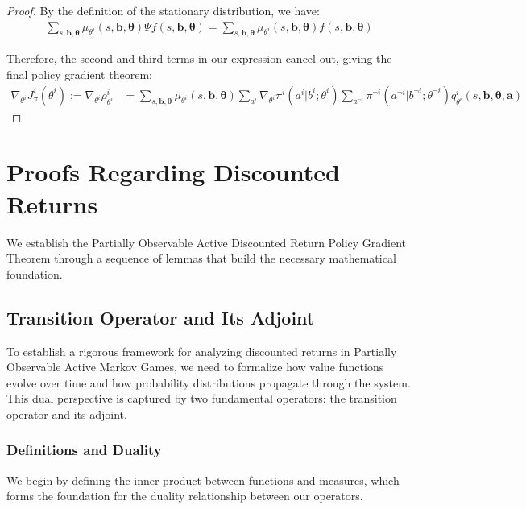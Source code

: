 \documentclass[a4paper,12pt]{report}
\begin{document}
\begin{proof}
    By the definition of the stationary distribution, we have:
    \begin{align}
        \sum_{s, \boldsymbol{b}, \boldsymbol{\theta}}\mu_{\theta^i}(s, \boldsymbol{b}, \boldsymbol{\theta}) \Psi f(s, \boldsymbol{b}, \boldsymbol{\theta}) = \sum_{s, \boldsymbol{b}, \boldsymbol{\theta}}\mu_{\theta^i}(s, \boldsymbol{b}, \boldsymbol{\theta}) f(s, \boldsymbol{b}, \boldsymbol{\theta})
    \end{align}

    Therefore, the second and third terms in our expression cancel out, giving the
    final policy gradient theorem:
    \begin{align}
        \nabla_{\theta^i}J^{i}_{\pi}(\theta^{i}) := \nabla_{\theta^i}\rho^{i}_{\theta^i} & = \sum_{s, \boldsymbol{b}, \boldsymbol{\theta}}\mu_{\theta^i}(s, \boldsymbol{b}, \boldsymbol{\theta}) \sum_{a^i}\nabla_{\theta^i}\pi^{i}(a^{i}|b^{i}; \theta^{i}) \sum_{a^{\neg i}}\pi^{\neg i}(a^{\neg i}|b^{\neg i}; \theta^{\neg i}) q^{i}_{\theta^i}(s, \boldsymbol{b}, \boldsymbol{\theta}, \boldsymbol{a})
    \end{align}
\end{proof}

\chapter{Proofs Regarding Discounted Returns}
\label{appendix:discounted_proofs} We establish the Partially Observable Active Discounted
Return Policy Gradient Theorem through a sequence of lemmas that build the necessary
mathematical foundation.
\section{Transition Operator and Its Adjoint}
To establish a rigorous framework for analyzing discounted returns in Partially
Observable Active Markov Games, we need to formalize how value functions evolve over
time and how probability distributions propagate through the system. This dual
perspective is captured by two fundamental operators: the transition operator and
its adjoint.

\subsection{Definitions and Duality}

We begin by defining the inner product between functions and measures, which forms
the foundation for the duality relationship between our operators.
\end{document}
